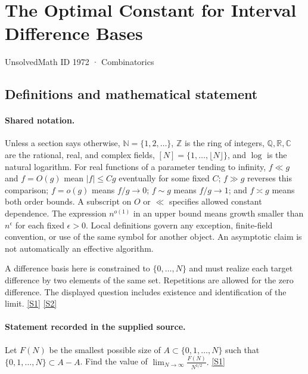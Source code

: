 \documentclass[11pt,a4paper]{article}
\newcommand{\N}{\mathbb{N}}
\newcommand{\Z}{\mathbb{Z}}
\newcommand{\Q}{\mathbb{Q}}
\newcommand{\R}{\mathbb{R}}
\newcommand{\C}{\mathbb{C}}
\newcommand{\sref}[2]{\hyperlink{source:#1:#2}{[S#2]}}
\begin{document}

\setcounter{section}{1971}

\section{The Optimal Constant for Interval Difference Bases}\label{1972}

{\small\sffamily UnsolvedMath ID 1972 · Combinatorics}

\subsection{Definitions and mathematical statement}

\paragraph{Shared notation.}Unless a section says otherwise, $\N=\{1,2,\ldots\}$,
$\Z$ is the ring of integers, $\Q,\R,\C$ are the rational, real, and complex
fields, $[N]=\{1,\ldots,\lfloor N\rfloor\}$, and $\log$ is the natural
logarithm. For real functions of a parameter tending to infinity,
$f\ll g$ and $f=O(g)$ mean $|f|\leq Cg$ eventually for some fixed $C$;
$f\gg g$ reverses this comparison; $f=o(g)$ means $f/g\to0$;
$f\sim g$ means $f/g\to1$; and $f\asymp g$ means both order bounds.
A subscript on $O$ or $\ll$ specifies allowed constant dependence.
The expression $n^{o(1)}$ in an upper bound means growth smaller than
$n^\epsilon$ for each fixed $\epsilon>0$. Local definitions govern any
exception, finite-field convention, or use of the same symbol for another
object. An asymptotic claim is not automatically an effective algorithm.



A difference basis here is constrained to $\{0,\ldots,N\}$ and must realize each target difference by two elements of the same set. Repetitions are allowed for the zero difference. The displayed question includes existence and identification of the limit. \sref{1972}{1} \sref{1972}{2}

\paragraph{Statement recorded in the supplied source.}
Let $F(N)$ be the smallest possible size of $A\subset \{0,1,\ldots,N\}$ such that $\{0,1,\ldots,N\}\subset A-A$. Find the value of $ \lim_{N\to \infty}\frac{F(N)}{N^{1/2}}. $ \sref{1972}{1}
\end{document}
